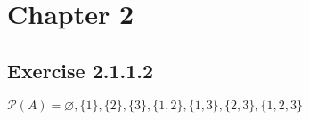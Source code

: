 \documentclass[14pt]{article}
\let\emptyset\varnothing
\begin{document}
\section*{Chapter 2}

\subsection*{Exercise 2.1.1.2}
$\mathcal{P}(A) = \emptyset, \{1\}, \{2\}, \{3\}, \{1,2\}, \{1,3\}, \{2,3\}, \{1,2,3\}$
\end{document}

